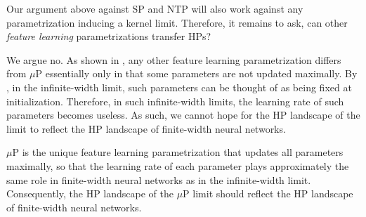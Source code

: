 \documentclass{article}
\theoremstyle{definition}
\begin{document}
    Our argument above against SP and NTP will also work against any parametrization inducing a kernel limit.
    Therefore, it remains to ask, can other \emph{feature learning} parametrizations transfer HPs?
    
    We argue no. As shown in \cite{TP4}, any other feature learning parametrization differs from $\mu$P essentially only in that some parameters are not updated maximally.
    By \citep[Sec 6.4]{TP4}, in the infinite-width limit, such parameters can be thought of as being fixed at initialization. Therefore, in such infinite-width limits, the learning rate of such parameters becomes useless.
    As such, we cannot hope for the HP landscape of the limit to reflect the HP landscape of finite-width neural networks.
    
    $\mu$P is the unique feature learning parametrization that updates all parameters maximally, so that the learning rate of each parameter plays approximately the same role in finite-width neural networks as in the infinite-width limit. Consequently, the HP landscape of the $\mu$P limit should reflect the HP landscape of finite-width neural networks.
    
    
    
    
    
    
    
    
    
    
\end{document}
